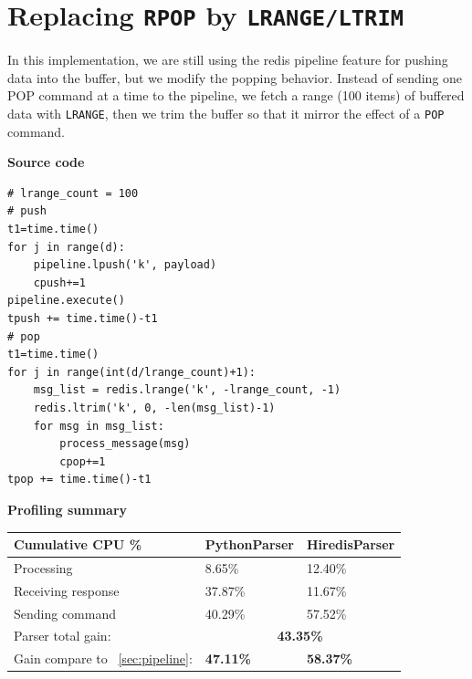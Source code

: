 \documentclass[a4paper, 11pt]{report}
\begin{document}
\newpage
\section{Replacing \texttt{RPOP} by \texttt{LRANGE/LTRIM}\label{sec:lrange}}
In this implementation, we are still using the redis pipeline feature for pushing data into the buffer, but we modify the popping behavior.
Instead of sending one POP command at a time to the pipeline, we fetch a range (100 items) of buffered data with \texttt{LRANGE}, then we trim the buffer so that it mirror the effect of a \texttt{POP} command.\\

\begin{minipage}[t]{0.45\textwidth}
\textbf{Source code}\\
\vspace{-0.5em}
\begin{lstlisting}
# lrange_count = 100
# push
t1=time.time()
for j in range(d):
    pipeline.lpush('k', payload)
    cpush+=1
pipeline.execute()
tpush += time.time()-t1
# pop
t1=time.time()
for j in range(int(d/lrange_count)+1):
    msg_list = redis.lrange('k', -lrange_count, -1)
    redis.ltrim('k', 0, -len(msg_list)-1)
    for msg in msg_list:
        process_message(msg)
        cpop+=1
tpop += time.time()-t1
\end{lstlisting}
\end{minipage}
\quad
\begin{minipage}[t]{0.5\textwidth}
\textbf{Profiling summary}\\

    \begin{tabular}{|l|l|l|}
        \hline
        Cumulative CPU \% & PythonParser & HiredisParser\\
        \hline
        Processing & 8.65\% & 12.40\%\\
        \hline
        Receiving response & 37.87\% & 11.67\%\\
        \hline
        Sending command & 40.29\% & 57.52\%\\
        \hline
        Parser total gain: & \multicolumn{2}{c|}{\textbf{43.35\%}}\\
        \hline
        Gain compare to ~\ref{sec:pipeline}: & \textbf{47.11\%} & \textbf{58.37\%}\\
        \hline
    \end{tabular}
\end{minipage}
\end{document}
